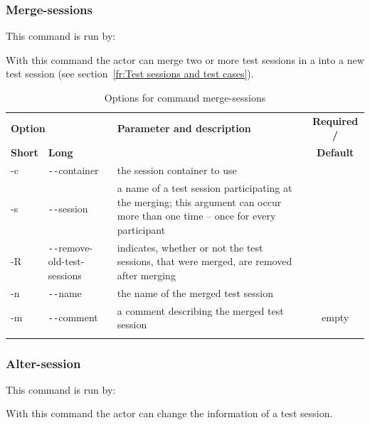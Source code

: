 \newline

\subsubsection{Merge-sessions}
This command is run by:
\begin{quote}
\end{quote}
\par
With this command the actor can merge two or more test sessions in a  into a new test session (see section~\ref{fr:Test sessions and test cases}).

\begin{longtable}{|l|l|p{73mm}|c|}\hline
   \multicolumn{2}{|l|}{\textbf{Option}} & 
   {\textbf{Parameter and description}} & 
   {\textbf{Required /}} \\
   {\textbf{Short}} &
   {\textbf{Long}} &
    & 
   {\textbf{Default}} \\\hline \hline \endhead
   -c & \verb$--$container & the session container to use & \x \\\hline
   -s & \verb$--$session & a name of a test session participating at the merging; this argument can occur more than one time -- once for every participant & \x \\\hline
   -R & \verb$--$remove-old-test-sessions & indicates, whether or not the test sessions, that were merged, are removed after merging & \\\hline
   -n & \verb$--$name & the name of the merged test session & \x \\\hline
   -m & \verb$--$comment & a comment describing the merged test session & empty \\\hline
  \caption{Options for command merge-sessions}
  \label{fr_tb:Options for command merge-sessions}
\end{longtable}

\subsubsection{Alter-session}
This command is run by:
\begin{quote}
\end{quote}
\par
With this command the actor can change the information of a test session.

